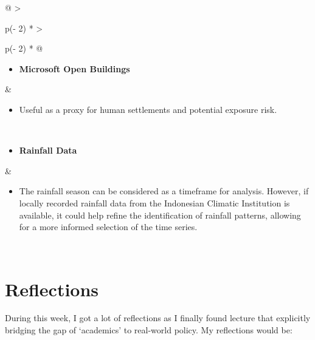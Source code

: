 \documentclass[
  letterpaper,
  DIV=11,
  numbers=noendperiod]{scrreprt}
\providecommand{\tightlist}{%
  \setlength{\itemsep}{0pt}\setlength{\parskip}{0pt}}\usepackage{longtable,booktabs,array}
\begin{document}
\begin{longtable}[]{@{}
  >{\raggedright\arraybackslash}p{(\columnwidth - 2\tabcolsep) * }
  >{\raggedright\arraybackslash}p{(\columnwidth - 2\tabcolsep) * }@{}}
\begin{minipage}[t]{\linewidth}
\begin{itemize}
\tightlist
\item
  \textbf{Microsoft Open Buildings}
\end{itemize}
\end{minipage} & \begin{minipage}[t]{\linewidth}\raggedright
\begin{itemize}
\tightlist
\item
  Useful as a proxy for human settlements and potential exposure risk.
\end{itemize}
\end{minipage} \\
\begin{minipage}[t]{\linewidth}\raggedright
\begin{itemize}
\tightlist
\item
  \textbf{Rainfall Data}
\end{itemize}
\end{minipage} & \begin{minipage}[t]{\linewidth}\raggedright
\begin{itemize}
\tightlist
\item
  The rainfall season can be considered as a timeframe for analysis.
  However, if locally recorded rainfall data from the Indonesian
  Climatic Institution is available, it could help refine the
  identification of rainfall patterns, allowing for a more informed
  selection of the time series.
\end{itemize}
\end{minipage} \\
\end{longtable}

\hypertarget{reflections-1}{%
\section{Reflections}\label{reflections-1}}

During this week, I got a lot of reflections as I finally found lecture
that explicitly bridging the gap of `academics' to real-world policy. My
reflections would be:
\end{document}
